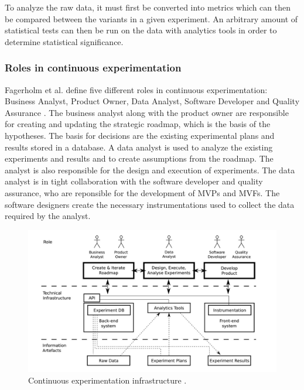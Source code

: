 \documentclass[english]{tktltiki2}
\theoremstyle{definition}
\theoremstyle{remark}
\begin{document}
To analyze the raw data, it must first be converted into metrics which can then be compared between the variants in a given experiment. An arbitrary amount of statistical tests can then be run on the data with analytics tools in order to determine statistical significance. 

\subsubsection{Roles in continuous experimentation}
Fagerholm et al. define five different roles in continuous experimentation: Business Analyst, Product Owner, Data Analyst, Software Developer and Quality Assurance \cite{fagerholm2014building}. The business analyst along with the product owner are responsible for creating and updating the strategic roadmap, which is the basis of the hypotheses. The basis for decisions are the existing experimental plans and results stored in a database. A data analyst is used to analyze the existing experiments and results and to create assumptions from the roadmap. The analyst is also responsible for the design and execution of experiments. The data analyst is in tight collaboration with the software developer and quality assurance, who are reponsible for the development of MVPs and MVFs. The software designers create the necessary instrumentations used to collect the data required by the analyst.


\begin{figure}[h]
	\centering
	\includegraphics[width=5in]{infra.jpg}
	\caption{Continuous experimentation infrastructure \cite{fagerholm2014building}.}
	\label{fig4}
\end{figure}
\end{document}
